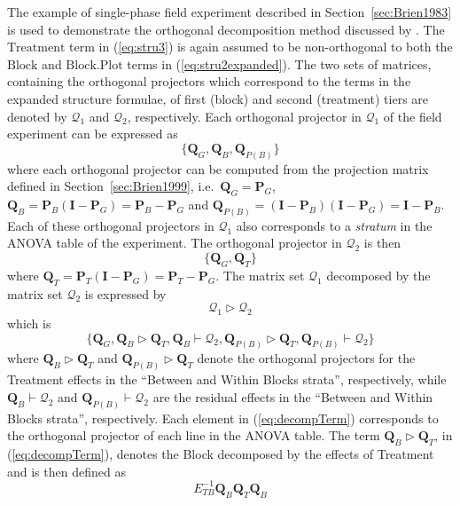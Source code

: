 \documentclass[11pt,a4paper]{article}
\newcommand{\mP}{\mathbf{P}}
\newcommand{\I}{\mathbf{I}}
\newcommand{\Q}{\mathbf{Q}}
\begin{document}
The example of single-phase field experiment described in Section~\ref{sec:Brien1983} is used to demonstrate the orthogonal decomposition method discussed by \cite{Brien2009, Brien2010}. The $\mathrm{Treatment}$ term in (\ref{eq:stru3}) is again assumed to be non-orthogonal to both the $\mathrm{Block}$ and $\mathrm{Block.Plot}$ terms in (\ref{eq:stru2expanded}). The two sets of matrices, containing the orthogonal projectors which correspond to the terms in the expanded structure formulae, of first (block) and second (treatment) tiers are denoted by $\mathcal{Q}_1$ and $\mathcal{Q}_2$, respectively. Each orthogonal projector in $\mathcal{Q}_1$ of the field experiment can be expressed as
\begin{equation}\label{eq:orthField}
\{\Q_{G}, \Q_{B}, \Q_{P(B)}\}
\end{equation}
where each orthogonal projector can be computed from the projection matrix defined in Section~\ref{sec:Brien1999}, i.e.\
$\Q_{G} = \mP_G$, $\Q_{B} = \mP_{B}(\I - \mP_G) =  \mP_{B} - \mP_G$ and $\Q_{P(B)} = (\I - \mP_{B})(\I - \mP_G) = \I  - \mP_{B}$. Each of these orthogonal projectors in $\mathcal{Q}_1$ also corresponds to a \emph{stratum} in the ANOVA table of the experiment. The orthogonal projector in $\mathcal{Q}_2$ is then
\begin{equation}\label{eq:orthTrt}
\{\Q_{G}, \Q_{T}\}
\end{equation}
where
$\Q_{T} = \mP_{T}(\I - \mP_G) = \mP_{T}- \mP_G$.
The matrix set $\mathcal{Q}_1$ decomposed by the matrix set $\mathcal{Q}_2$ is expressed by
\begin{equation}\label{eq:decomp}
\mathcal{Q}_1 \rhd \mathcal{Q}_2
\end{equation}
which is 
\begin{equation}\label{eq:decompTerm}
 \{\Q_{G}, \Q_{B}  \rhd \Q_{T}, \Q_{B} \vdash \mathcal{Q}_2, \Q_{P(B)} \rhd \Q_{T}, \Q_{P(B)} \vdash \mathcal{Q}_2\}
\end{equation}
where $\Q_{B}  \rhd \Q_{T}$ and  $\Q_{P(B)} \rhd \Q_{T}$ denote the orthogonal projectors for the Treatment effects in the ``Between and Within Blocks strata'', respectively, while $\Q_{B} \vdash \mathcal{Q}_2$ and $\Q_{P(B)} \vdash \mathcal{Q}_2$ are the residual effects in the ``Between and Within Blocks strata'', respectively. Each element in (\ref{eq:decompTerm}) corresponds to the orthogonal projector of each line in the ANOVA table. The term $\Q_{B}  \rhd \Q_{T}$, in (\ref{eq:decompTerm}), denotes the Block decomposed by the effects of Treatment and is then defined as 
\[E_{TB}^{-1}\Q_{B}\Q_{T}\Q_{B} \]
\end{document}
